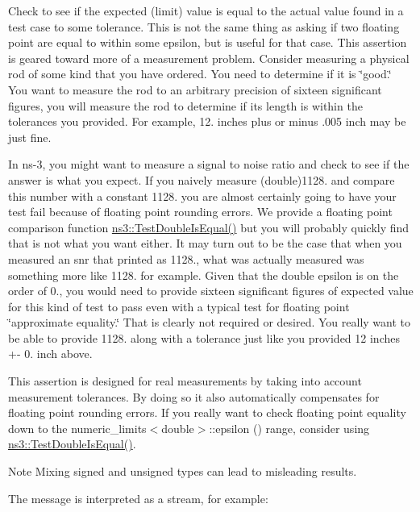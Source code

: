 Check to see if the expected (limit) value is equal to the actual value found in a test case to some tolerance. This is not the same thing as asking if two floating point are equal to within some epsilon, but is useful for that case. This assertion is geared toward more of a measurement problem. Consider measuring a physical rod of some kind that you have ordered. You need to determine if it is \char`\"{}good.\char`\"{} You want to measure the rod to an arbitrary precision of sixteen significant figures, you will measure the rod to determine if its length is within the tolerances you provided. For example, 12. inches plus or minus .005 inch may be just fine.

In ns-\/3, you might want to measure a signal to noise ratio and check to see if the answer is what you expect. If you naively measure (double)1128. and compare this number with a constant 1128. you are almost certainly going to have your test fail because of floating point rounding errors. We provide a floating point comparison function \hyperlink{group__testing_ga13a5d60f4d34641d7e2fd799f2c4d952}{ns3\+::\+Test\+Double\+Is\+Equal()} but you will probably quickly find that is not what you want either. It may turn out to be the case that when you measured an snr that printed as 1128., what was actually measured was something more like 1128. for example. Given that the double epsilon is on the order of 0., you would need to provide sixteen significant figures of expected value for this kind of test to pass even with a typical test for floating point \char`\"{}approximate
equality.\char`\"{} That is clearly not required or desired. You really want to be able to provide 1128. along with a tolerance just like you provided 12 inches +-\/ 0. inch above.

This assertion is designed for real measurements by taking into account measurement tolerances. By doing so it also automatically compensates for floating point rounding errors. If you really want to check floating point equality down to the numeric\+\_\+limits$<$double$>$\+::epsilon () range, consider using \hyperlink{group__testing_ga13a5d60f4d34641d7e2fd799f2c4d952}{ns3\+::\+Test\+Double\+Is\+Equal()}.

\begin{DoxyNote}{Note}
Mixing signed and unsigned types can lead to misleading results.
\end{DoxyNote}
The message is interpreted as a stream, for example\+:


